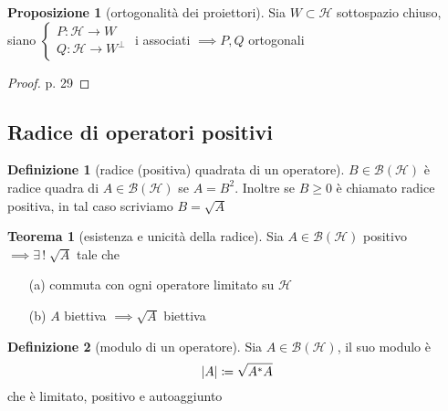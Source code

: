 \documentclass[a4paper,10pt]{article}
\theoremstyle{definition}
\newcommand{\hil}{\mathcal{H}} %
\theoremstyle{indentdefinition}
\newtheorem{defn}{Definizione}[section]
\theoremstyle{indenttheorem}
\newtheorem{thm}{Teorema}
\newtheorem{prop}{Proposizione}
\theoremstyle{myremark}
\theoremstyle{indentgeneral}
\newenvironment{myboxed} 
{\noindent\begin{lrbox}{\mybox}\begin{minipage}{\textwidth}}
{\end{minipage}\end{lrbox}\fbox{\usebox{\mybox}}}
\begin{document}
\begin{myboxed}
\begin{prop}[ortogonalità dei proiettori]
    Sia $W\subset \hil$ sottospazio chiuso, siano $\begin{cases}
        P: \hil\to W\\
        Q: \hil \to W^\perp
    \end{cases}$ i  associati $\implies P,Q$ ortogonali
\end{prop}
\end{myboxed}
\begin{proof}
    p. 29 \todo{}
\end{proof}

\subsection{Radice di operatori positivi}
\begin{defn}[radice (positiva) quadrata di un operatore]
    $B\in\mathcal{B}(\hil)$ è radice quadra di $A\in\mathcal{B}(\hil)$ se $A=B^2$. Inoltre se $B\ge 0$ è chiamato radice positiva, in tal caso scriviamo $B=\sqrt{A}$
\end{defn}

\begin{thm}[esistenza e unicità della radice]
    Sia $A\in\mathcal{B}(\hil)$ positivo $\implies \exists\,!\; \sqrt{A}$ tale che
    \begin{itemize}
        \item[(a)] commuta con ogni operatore limitato su $\hil$
         \item[(b)]  $A$ biettiva $\implies \sqrt{A}$ biettiva
    \end{itemize}
\end{thm}

\begin{defn}[modulo di un operatore]
    Sia $A\in\mathcal{B}(\hil)$, il suo modulo è
    $$\abs{A}\coloneqq\sqrt{A^*A}$$
    che è limitato, positivo e autoaggiunto
\end{defn}
\end{document}
